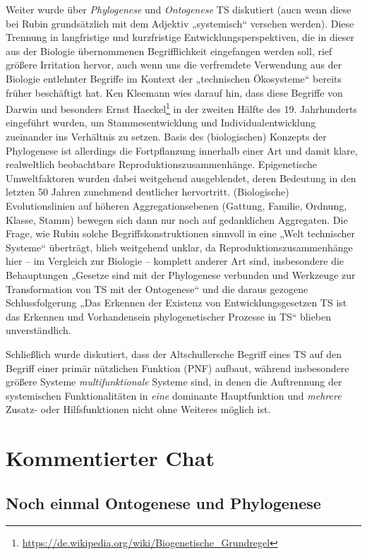 \documentclass[a4paper,11pt]{article}
\begin{document}
Weiter wurde über \emph{Phylogenese} und \emph{Ontogenese} TS diskutiert (aucn
wenn diese bei Rubin grundsätzlich mit dem Adjektiv „systemisch“ versehen
werden).  Diese Trennung in langfristige und kurzfristige
Entwicklungsperspektiven, die in dieser aus der Biologie übernommenen
Begrifflichkeit eingefangen werden soll, rief größere Irritation hervor, auch
wenn uns die verfremdete Verwendung aus der Biologie entlehnter Begriffe im
Kontext der „technischen Ökosysteme“ bereits früher beschäftigt hat.  Ken
Kleemann wies darauf hin, dass diese Begriffe von Darwin und besonders Ernst
Haeckel\footnote{\url{https://de.wikipedia.org/wiki/Biogenetische_Grundregel}}
in der zweiten Hälfte des 19. Jahrhunderts eingeführt wurden, um
Stammesentwicklung und Individualentwicklung zueinander ins Verhältnis zu
setzen.  Basis des (biologischen) Konzepts der Phylogenese ist allerdings die
Fortpflanzung innerhalb einer Art und damit klare, realweltlich beobachtbare
Reproduktionszusammenhänge.  Epigenetische Umweltfaktoren wurden dabei
weitgehend ausgeblendet, deren Bedeutung in den letzten 50 Jahren zunehmend
deutlicher hervortritt.  (Biologische) Evolutionslinien auf höheren
Aggregationsebenen (Gattung, Familie, Ordnung, Klasse, Stamm) bewegen sich
dann nur noch auf gedanklichen Aggregaten. Die Frage, wie Rubin solche
Begriffskonstruktionen sinnvoll in eine „Welt technischer Systeme“ überträgt,
blieb weitgehend unklar, da Reproduktionszusammenhänge hier -- im Vergleich
zur Biologie -- komplett anderer Art sind, insbesondere die Behauptungen
„Gesetze sind mit der Phylogenese verbunden und Werkzeuge zur Transformation
von TS mit der Ontogenese“ und die daraus gezogene Schlussfolgerung „Das
Erkennen der Existenz von Entwicklungsgesetzen TS ist das Erkennen und
Vorhandensein phylogenetischer Prozesse in TS“ blieben unverständlich. 

Schließlich wurde diskutiert, dass der Altschullersche Begriff eines TS auf
den Begriff einer primär nützlichen Funktion (PNF) aufbaut, während
insbesondere größere Systeme \emph{multifunktionale} Systeme sind, in denen
die Auftrennung der systemischen Funktionalitäten in \emph{eine} dominante
Hauptfunktion und \emph{mehrere} Zusatz- oder Hilfsfunktionen nicht ohne
Weiteres möglich ist.

\section{Kommentierter Chat}

\subsection*{Noch einmal Ontogenese und Phylogenese}
\end{document}
